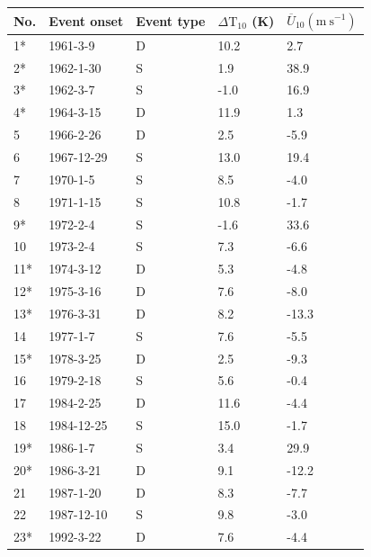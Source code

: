 \begin{table}
\begin{centering}
    \begin{tabular}{|l|l|l|l|l|}  \hline
    No. & Event onset & Event type & $\Delta \mathrm{T}_{10}$ (K) &
                                                                    $\overline{U}_{10} (\mathrm{m~s^{-1}})$ \\ \hline
    1*  & 1961-3-9    & D          & 10.2       & 2.7 \\
    2*  & 1962-1-30   & S          & 1.9        & 38.9 \\
    3*  & 1962-3-7    & S          & -1.0       & 16.9 \\
    4*  & 1964-3-15   & D          & 11.9       & 1.3 \\
    5   & 1966-2-26   & D          & 2.5        & -5.9 \\
    6   & 1967-12-29  & S          & 13.0       & 19.4 \\
    7   & 1970-1-5    & S          & 8.5        & -4.0 \\
    8   & 1971-1-15   & S          & 10.8       & -1.7 \\
    9*  & 1972-2-4    & S          & -1.6       & 33.6 \\
    10  & 1973-2-4    & S          & 7.3        & -6.6 \\
    11* & 1974-3-12   & D          & 5.3        & -4.8 \\
    12* & 1975-3-16   & D          & 7.6        & -8.0 \\
    13* & 1976-3-31   & D          & 8.2        & -13.3 \\
    14  & 1977-1-7    & S          & 7.6        & -5.5 \\
    15* & 1978-3-25   & D          & 2.5        & -9.3 \\
    16  & 1979-2-18   & S          & 5.6        & -0.4 \\
    17  & 1984-2-25   & D          & 11.6       & -4.4 \\
    18  & 1984-12-25  & S          & 15.0       & -1.7 \\
    19* & 1986-1-7    & S          & 3.4        & 29.9 \\
    20* & 1986-3-21   & D          & 9.1        & -12.2 \\
    21  & 1987-1-20   & D          & 8.3        & -7.7 \\
    22  & 1987-12-10  & S          & 9.8        & -3.0 \\
    23* & 1992-3-22   & D          & 7.6        & -4.4 \\

\end{tabular}
\end{centering}
\end{table}
